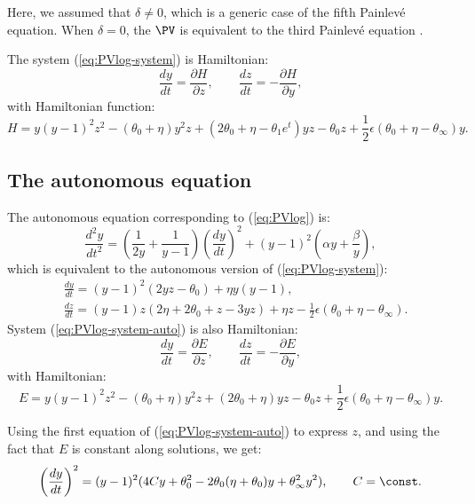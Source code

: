 \begin{remark}
Here, we assumed that $\delta\neq0$, which is a generic case of the fifth Painlev\'e equation.
When $\delta=0$, the $\PV$ is equivalent to the third Painlev\'e equation \cite{OO2006}.
\end{remark}

The system (\ref{eq:PVlog-system}) is Hamiltonian:
$$
\frac{dy}{dt}=\frac{\partial H}{\partial z},
\qquad
\frac{dz}{dt}=-\frac{\partial H}{\partial y},
$$
with Hamiltonian function:
\begin{equation}\label{eq:H}
H=y(y-1)^2z^2-(\theta_0+\eta)y^2z+(2\theta_0+\eta-\theta_1 e^t)yz-\theta_0z+\frac12\epsilon(\theta_0+\eta-\theta_{\infty})y.
\end{equation}


\subsection{The autonomous equation}
\label{sec:auto}

The autonomous equation corresponding to (\ref{eq:PVlog}) is:
\begin{equation}\label{eq:PVlog-auto}
\frac{d^2y}{dt^2}=\left(\frac{1}{2y}+\frac{1}{y-1}\right) \left(\frac{dy}{dt}\right)^2+(y-1)^2\left(\alpha y+\frac{\beta}{y}\right),
\end{equation}
which is equivalent to the autonomous version of (\ref{eq:PVlog-system}):
\begin{equation}\label{eq:PVlog-system-auto}
\begin{aligned}
&\frac{dy}{dt}=
(y-1)^2(2yz-\theta_0)+\eta y(y-1),
\\
&\frac{dz}{dt}=
(y-1)z(2\eta+2\theta_0+z-3yz)+\eta z-\frac12\epsilon(\theta_0+\eta-\theta_{\infty}).
\end{aligned}
\end{equation}
System (\ref{eq:PVlog-system-auto}) is also Hamiltonian:
$$
\frac{dy}{dt}=\frac{\partial E}{\partial z},
\qquad
\frac{dz}{dt}=-\frac{\partial E}{\partial y},
$$
with Hamiltonian:
\begin{equation}\label{eq:E}
E=y(y-1)^2z^2-(\theta_0+\eta)y^2z+(2\theta_0+\eta)yz-\theta_0z+\frac12\epsilon(\theta_0+\eta-\theta_{\infty})y.
\end{equation}

Using the first equation of (\ref{eq:PVlog-system-auto}) to express $z$, and using the fact that $E$ is constant along solutions, we get:
$$
\left(\frac{dy}{dt}\right)^2=(y-1)^2(4 C y + \theta_0^2 - 2 \theta_0 (\eta + \theta_0) y  + \theta_{\infty}^2  y^2 ),
\qquad
C=\const.
$$

